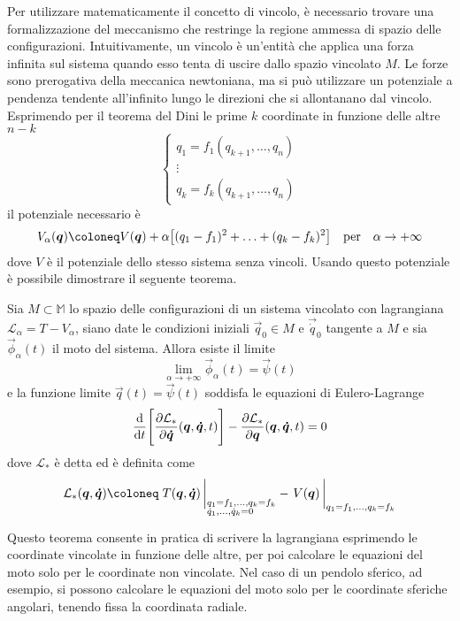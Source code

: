 Per utilizzare matematicamente il concetto di vincolo, è necessario trovare una formalizzazione del meccanismo che restringe la regione ammessa di spazio delle configurazioni. Intuitivamente, un vincolo è un'entità che applica una forza infinita sul sistema quando esso tenta di uscire dallo spazio vincolato $M$. Le forze sono prerogativa della meccanica newtoniana, ma si può utilizzare un potenziale a pendenza tendente all'infinito lungo le direzioni che si allontanano dal vincolo. Esprimendo per il teorema del Dini le prime $k$ coordinate in funzione delle altre $n-k$ \begin{equation}
\begin{cases}
  q_1 = f_1(q_{k+1}, \ldots, q_n) \\
  \vdots \\
  q_k = f_k(q_{k+1}, \ldots, q_n)
\end{cases}
\end{equation} 
il potenziale necessario è \begin{equation}
  V_{\alpha}(\vec{q}) \defeq V(\vec{q}) + \alpha\big[(q_1-f_1)^2 + \ldots + (q_k-f_k)^2 \big] \qqtext{per} \alpha \to +\infty
\end{equation} 
dove $V$ è il potenziale dello stesso sistema senza vincoli. Usando questo potenziale è possibile dimostrare il seguente teorema.
\begin{theorem}
  Sia $M \subset \mathbb{M}$ lo spazio delle configurazioni di un sistema vincolato con lagrangiana $\mathcal{L}_{\alpha} = T -V_{\alpha}$, siano date le condizioni iniziali $\vec{q}_0 \in  M$ e $\vec{\dot{q}}_0$ tangente a $M$ e sia $\vec{\phi}_{\alpha}(t)$ il moto del sistema. Allora esiste il limite \begin{equation}
  \lim_{\alpha \to +\infty} \vec{\phi}_{\alpha}(t) = \vec{\psi}(t)
  \end{equation} 
  e la funzione limite $\vec{q}(t) = \vec{\psi}(t)$ soddisfa le equazioni di Eulero-Lagrange \begin{equation}
    \dv{t}\Bigg[\pdv{\mathcal{L}_{*}}{\boldsymbol{\dot{q}}}()(\boldsymbol{q},\boldsymbol{\dot{q}},t)\Bigg] - \pdv{\mathcal{L}_{*}}{\boldsymbol{q}}()(\boldsymbol{q},\boldsymbol{\dot{q}},t) = 0
  \end{equation} 
  dove $\mathcal{L}_*$ è detta  ed è definita come \begin{equation}
  \mathcal{L}_*(\vec{q},\vec{\dot{q}}) \defeq \eval{T(\vec{q},\vec{\dot{q}})\,}_{\begin{subarray}{l}
    q_1=f_1, \ldots, q_k=f_k \\
    \dot{q}_1, \ldots, \dot{q}_k = 0
  \end{subarray}} - \eval{V(\vec{q})\,}_{q_1=f_1, \ldots, q_k=f_k}
  \end{equation} 
\end{theorem} 
Questo teorema consente in pratica di scrivere la lagrangiana esprimendo le coordinate vincolate in funzione delle altre, per poi calcolare le equazioni del moto solo per le coordinate non vincolate. Nel caso di un pendolo sferico, ad esempio, si possono calcolare le equazioni del moto solo per le coordinate sferiche angolari, tenendo fissa la coordinata radiale.

